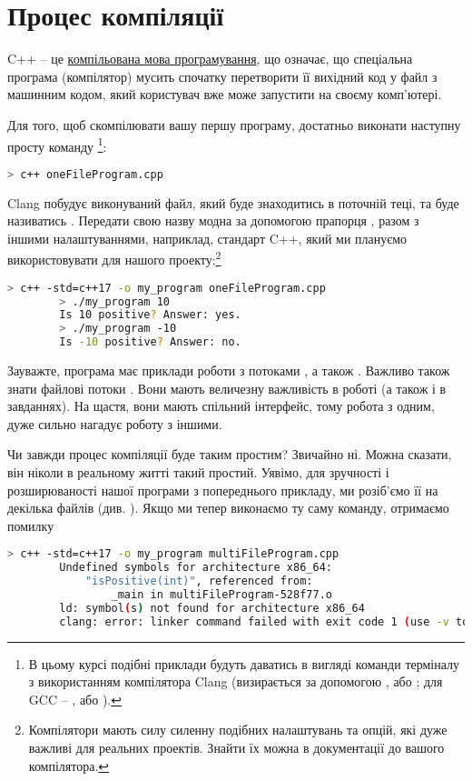 \documentclass[12pt]{article}
\begin{document}
	\section{Процес компіляції}

	C++ -- це \href{https://uk.wikipedia.org/wiki/%D0%9A%D0%BE%D0%BC%D0%BF%D1%96%D0%BB%D1%8C%D0%BE%D0%B2%D0%B0%D0%BD%D0%B0_%D0%BC%D0%BE%D0%B2%D0%B0_%D0%BF%D1%80%D0%BE%D0%B3%D1%80%D0%B0%D0%BC%D1%83%D0%B2%D0%B0%D0%BD%D0%BD%D1%8F}{компільована мова програмування}, що означає, що спеціальна програма (компілятор) мусить спочатку перетворити її вихідний код у файл з машинним кодом, який користувач вже може запустити на своєму комп'ютері. 

	Для того, щоб скомпілювати вашу першу програму, достатньо виконати наступну просту команду \footnote{В цьому курсі подібні приклади будуть даватись в вигляді команди терміналу з використанням компілятора Clang (визирається за допомогою , або ; для GCC --  , або ).}:
	\begin{lstlisting}[language=bash]
		> c++ oneFileProgram.cpp
	\end{lstlisting}

	Clang побудує виконуваний файл, який буде знаходитись в поточній теці, та буде називатись . Передати свою назву модна за допомогою прапорця , разом з іншими налаштуваннями, наприклад, стандарт C++, який ми плануємо використовувати для нашого проекту:\footnote{Компілятори мають силу силенну подібних налаштувань та опцій, які дуже важливі для реальних проектів. Знайти їх можна в документації до вашого компілятора.}
	\begin{lstlisting}[language=bash]
		> c++ -std=c++17 -o my_program oneFileProgram.cpp
		> ./my_program 10
		Is 10 positive? Answer: yes.
		> ./my_program -10
		Is -10 positive? Answer: no.
	\end{lstlisting}

	Зауважте, програма  має приклади роботи з потоками , а також . Важливо також знати файлові потоки . Вони мають величезну важливість в роботі (а також і в завданнях). На щастя, вони мають спільний інтерфейс, тому робота з одним, дуже сильно нагадує роботу з іншими.

	Чи завжди процес компіляції буде таким простим? Звичайно ні. Можна сказати, він ніколи в реальному житті такий простий. Уявімо, для зручності і розширюваності нашої програми з попереднього прикладу, ми розіб'ємо її на декілька файлів (див. ).
	Якщо ми тепер виконаємо ту саму команду, отримаємо помилку
	\begin{lstlisting}[language=bash]
		> c++ -std=c++17 -o my_program multiFileProgram.cpp
		Undefined symbols for architecture x86_64:
			"isPositive(int)", referenced from:
				_main in multiFileProgram-528f77.o
		ld: symbol(s) not found for architecture x86_64
		clang: error: linker command failed with exit code 1 (use -v to see invocation)
	\end{lstlisting}
\end{document}
